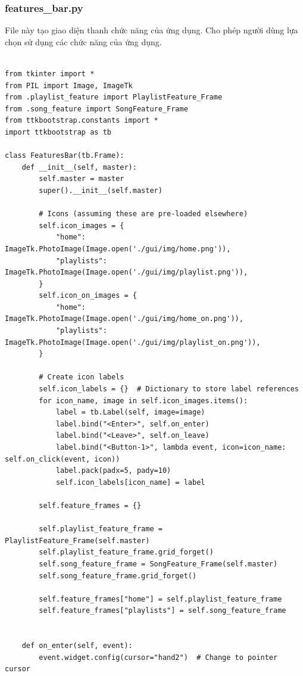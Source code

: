 \documentclass[a4paper]{article}
\begin{document}
\subsubsection{features\_bar.py}
File này tạo giao diện thanh chức năng của ứng dụng. Cho phép người dùng lựa chọn sử dụng các chức năng của ứng dụng.
\begin{mdframed}[hidealllines=true,backgroundcolor=magenta!10]
\begin{lstlisting}

from tkinter import *
from PIL import Image, ImageTk
from .playlist_feature import PlaylistFeature_Frame
from .song_feature import SongFeature_Frame
from ttkbootstrap.constants import *
import ttkbootstrap as tb

class FeaturesBar(tb.Frame):
    def __init__(self, master):
        self.master = master
        super().__init__(self.master)

        # Icons (assuming these are pre-loaded elsewhere)
        self.icon_images = {
            "home": ImageTk.PhotoImage(Image.open('./gui/img/home.png')),
            "playlists": ImageTk.PhotoImage(Image.open('./gui/img/playlist.png')),
        }
        self.icon_on_images = {
            "home": ImageTk.PhotoImage(Image.open('./gui/img/home_on.png')),
            "playlists": ImageTk.PhotoImage(Image.open('./gui/img/playlist_on.png')),
        }

        # Create icon labels
        self.icon_labels = {}  # Dictionary to store label references
        for icon_name, image in self.icon_images.items():
            label = tb.Label(self, image=image)
            label.bind("<Enter>", self.on_enter)
            label.bind("<Leave>", self.on_leave)
            label.bind("<Button-1>", lambda event, icon=icon_name: self.on_click(event, icon))
            label.pack(padx=5, pady=10)
            self.icon_labels[icon_name] = label

        self.feature_frames = {}

        self.playlist_feature_frame = PlaylistFeature_Frame(self.master)
        self.playlist_feature_frame.grid_forget()
        self.song_feature_frame = SongFeature_Frame(self.master)
        self.song_feature_frame.grid_forget()

        self.feature_frames["home"] = self.playlist_feature_frame
        self.feature_frames["playlists"] = self.song_feature_frame


    def on_enter(self, event):
        event.widget.config(cursor="hand2")  # Change to pointer cursor


\end{lstlisting}
\end{mdframed}
\end{document}
